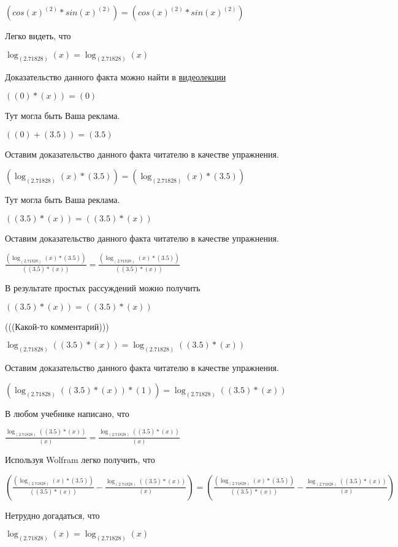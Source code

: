 \documentclass[12pt,a4paper,fleqn]{article}
\theoremstyle{definition}
\begin{document}
$(cos{( x )}^{( 2 )} * sin{( x )}^{( 2 )}) = (cos{( x )}^{( 2 )} * sin{( x )}^{( 2 )})$

Легко видеть, что

$\log_{( 2.71828 )}{( x )} = \log_{( 2.71828 )}{( x )}$

Доказательство данного факта можно найти в \href{https://www.youtube.com/watch?v=dQw4w9WgXcQ}{видеолекции}

$(( 0 ) * ( x )) = ( 0 )$

Тут могла быть Ваша реклама.

$(( 0 ) + ( 3.5 )) = ( 3.5 )$

Оставим доказательство данного факта читателю в качестве упражнения.

$(\log_{( 2.71828 )}{( x )} * ( 3.5 )) = (\log_{( 2.71828 )}{( x )} * ( 3.5 ))$

Тут могла быть Ваша реклама.

$(( 3.5 ) * ( x )) = (( 3.5 ) * ( x ))$

Оставим доказательство данного факта читателю в качестве упражнения.

$\frac{(\log_{( 2.71828 )}{( x )} * ( 3.5 ))}{(( 3.5 ) * ( x ))}
 = \frac{(\log_{( 2.71828 )}{( x )} * ( 3.5 ))}{(( 3.5 ) * ( x ))}
$

В результате простых рассуждений можно получить

$(( 3.5 ) * ( x )) = (( 3.5 ) * ( x ))$

(((Какой-то комментарий)))

$\log_{( 2.71828 )}{(( 3.5 ) * ( x ))} = \log_{( 2.71828 )}{(( 3.5 ) * ( x ))}$

Оставим доказательство данного факта читателю в качестве упражнения.

$(\log_{( 2.71828 )}{(( 3.5 ) * ( x ))} * ( 1 )) = \log_{( 2.71828 )}{(( 3.5 ) * ( x ))}$

В любом учебнике написано, что

$\frac{\log_{( 2.71828 )}{(( 3.5 ) * ( x ))}}{( x )}
 = \frac{\log_{( 2.71828 )}{(( 3.5 ) * ( x ))}}{( x )}
$

Используя Wolfram легко получить, что

$(\frac{(\log_{( 2.71828 )}{( x )} * ( 3.5 ))}{(( 3.5 ) * ( x ))}
 - \frac{\log_{( 2.71828 )}{(( 3.5 ) * ( x ))}}{( x )}
) = (\frac{(\log_{( 2.71828 )}{( x )} * ( 3.5 ))}{(( 3.5 ) * ( x ))}
 - \frac{\log_{( 2.71828 )}{(( 3.5 ) * ( x ))}}{( x )}
)$

Нетрудно догадаться, что

$\log_{( 2.71828 )}{( x )} = \log_{( 2.71828 )}{( x )}$
\end{document}
